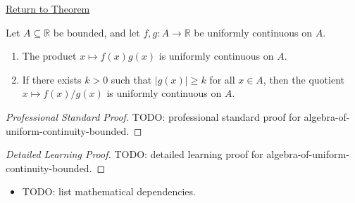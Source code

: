 \newpage
{}
\label{prf:algebra-of-uniform-continuity-bounded}

\begin{remark*}[Return]
\hyperref[thm:algebra-of-uniform-continuity-bounded]{Return to Theorem}
\end{remark*}

\begin{theorem*}
Let $A \subseteq \mathbb{R}$ be bounded, and let $f,g:A \to \mathbb{R}$ be uniformly continuous on $A$.
\begin{enumerate}[label=(\alph*)]
\item The product $x \mapsto f(x)g(x)$ is uniformly continuous on $A$.
\item If there exists $k>0$ such that $|g(x)| \ge k$ for all $x \in A$, then the quotient $x \mapsto f(x)/g(x)$ is uniformly continuous on $A$.
\end{enumerate}
\end{theorem*}

\begin{proof}[Professional Standard Proof]
\LRAProofBodyStart
TODO: professional standard proof for algebra-of-uniform-continuity-bounded.
\end{proof}

\begin{proof}[Detailed Learning Proof]
\LRAProofBodyStart
TODO: detailed learning proof for algebra-of-uniform-continuity-bounded.
\end{proof}

\begin{remark*}
\end{remark*}

\begin{dependencies}
\begin{itemize}
  \item TODO: list mathematical dependencies.
\end{itemize}
\end{dependencies}

\clearpage
